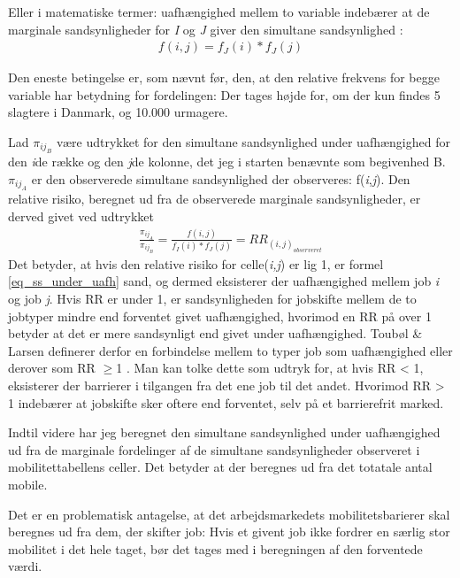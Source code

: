 Eller i matematiske termer: uafhængighed mellem to variable indebærer at de marginale sandsynligheder for \emph{I} og \emph{J} giver den simultane sandsynlighed \parencite[43f]{Malchow-MoellerWuertz2010}:
%
\begin{align} \label{eq_ss_under_uafh} 
f(i,j) = f_{J}(i)*f_{J}(j)
\end{align} 
%

Den eneste betingelse er, som nævnt før, den, at den relative frekvens for begge variable har betydning for fordelingen: Der tages højde for, om der kun findes 5 slagtere i Danmark, og 10.000 urmagere.

Lad $\pi_{ij_{B}}$ være udtrykket for den simultane sandsynlighed under uafhængighed for den \emph{i}de række og den \emph{j}de kolonne, det jeg i starten benævnte som begivenhed B. $\pi_{ij_{A}}$ er den observerede simultane sandsynlighed der observeres: f(\emph{i},\emph{j}). Den relative risiko, beregnet ud fra de observerede marginale sandsynligheder, er derved givet ved udtrykket   
%
\begin{align} \label{eq_RR_observeret1}
\frac{\pi_{ij_{A}}}{\pi_{ij_{B}}} = \frac{f(i,j)}{f_{I}(i)*f_{J}(j)} = RR_{(i,j)_{observeret}}
\end{align} 
%
Det betyder, at hvis den relative risiko for celle(\emph{i,j}) er lig 1, er formel \ref{eq_ss_under_uafh} sand, og dermed eksisterer der uafhængighed mellem job \emph{i} og job \emph{j}. Hvis RR er under 1, er sandsynligheden for jobskifte mellem de to jobtyper mindre end forventet givet uafhængighed, hvorimod en RR på over 1 betyder at det er mere sandsynligt end givet under uafhængighed. Toubøl \& Larsen definerer derfor en forbindelse mellem to typer job som uafhængighed eller derover som RR $\geq$1 \parencite[9]{Touboel2013}. Man kan tolke dette som udtryk for, at hvis RR < 1, eksisterer der barrierer i tilgangen fra det ene job til det andet. Hvorimod RR > 1 indebærer at jobskifte sker oftere end forventet, selv på et barrierefrit marked. 

Indtil videre har jeg beregnet den simultane sandsynlighed under uafhængighed ud fra de marginale fordelinger af de simultane sandsynligheder observeret i mobilitettabellens celler. Det betyder at der beregnes ud fra det totatale antal mobile. 

Det er en problematisk antagelse, at det arbejdsmarkedets mobilitetsbarierer skal beregnes ud fra dem, der skifter job: Hvis et givent job ikke fordrer en særlig stor mobilitet i det hele taget, bør det tages med i beregningen af den forventede værdi. 

